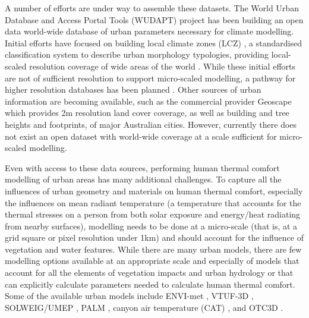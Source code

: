 \documentclass[final,3p,times,authoryear]{elsarticle}
\begin{document}
A number of efforts are under way to assemble these datasets.  The World Urban Database and Access Portal Tools (WUDAPT) project \citep{Ching2018a} has been building an open data world-wide database of urban parameters necessary for climate modelling. Initial efforts have focused on building local climate zones (LCZ) \citep{Stewart2012b}, a standardised classification system to describe urban morphology typologies, providing local-scaled resolution coverage of wide areas of the world \citep{Demuzere2019}. While these initial efforts are not of sufficient resolution to support micro-scaled modelling, a pathway for higher resolution databases has been planned \citep{Ching2019}.  Other sources of urban information are becoming available, such as the commercial provider Geoscape \citep{Geoscape2020} which provides 2m resolution land cover coverage, as well as building and tree heights and footprints, of major Australian cities. However, currently there does not exist an open dataset with world-wide coverage at a scale sufficient for micro-scaled modelling.

Even with access to these data sources, performing human thermal comfort modelling of urban areas has many additional challenges.  To capture all the influences of urban geometry and materials on human thermal comfort, especially the influences on mean radiant temperature \citep{Kantor2011} (a temperature that accounts for the thermal stresses on a person from both solar exposure and energy/heat radiating from nearby surfaces), modelling needs to be done at a micro-scale (that is, at a grid square or pixel resolution under 1km)  and should account for the influence of vegetation and water features. While there are many urban models, there are few modelling options available at an appropriate scale and especially of models that account for all the elements of vegetation impacts and urban hydrology or that can explicitly calculate parameters needed to calculate human thermal comfort. Some of the available urban models include ENVI-met \citep{Bruse1999}, VTUF-3D \citep{Nice2018a}, SOLWEIG/UMEP \citep{Lindberg2018}, PALM \citep{Dominik2019}, canyon air temperature (CAT) \citep{Erell2006}, and OTC3D \citep{Nazarian2018}. 
\end{document}
